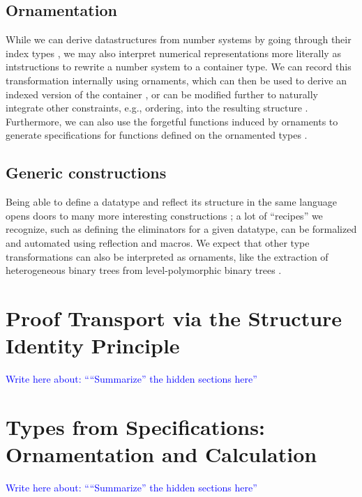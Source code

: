 \documentclass{article}
\theoremstyle{plain}%
\theoremstyle{definition}
\newcommand{\towrite}[1]{\par\textcolor{blue}{Write here about: ``#1''}\par}
\begin{document}

\subsection{Ornamentation}
While we can derive datastructures from number systems by going through their index types \cite{calcdata}, we may also interpret numerical representations more literally as intstructions to rewrite a number system to a container type. We can record this transformation internally using ornaments, which can then be used to derive an indexed version of the container \cite{algorn}, or can be modified further to naturally integrate other constraints, e.g., ordering, into the resulting structure \cite{progorn}. Furthermore, we can also use the forgetful functions induced by ornaments to generate specifications for functions defined on the ornamented types \cite{orntrans}.

\subsection{Generic constructions}
Being able to define a datatype and reflect its structure in the same language opens doors to many more interesting constructions \cite{practgen}; a lot of ``recipes'' we recognize, such as defining the eliminators for a given datatype, can be formalized and automated using reflection and macros. We expect that other type transformations can also be interpreted as ornaments, like the extraction of heterogeneous binary trees from level-polymorphic binary trees \cite{hetbin}. 


\section{Proof Transport via the Structure Identity Principle}\label{sec:leibniz}
\towrite{``Summarize'' the hidden sections here}
%

\section{Types from Specifications: Ornamentation and Calculation}\label{sec:numrep}
\towrite{``Summarize'' the hidden sections here}
%
\end{document}
